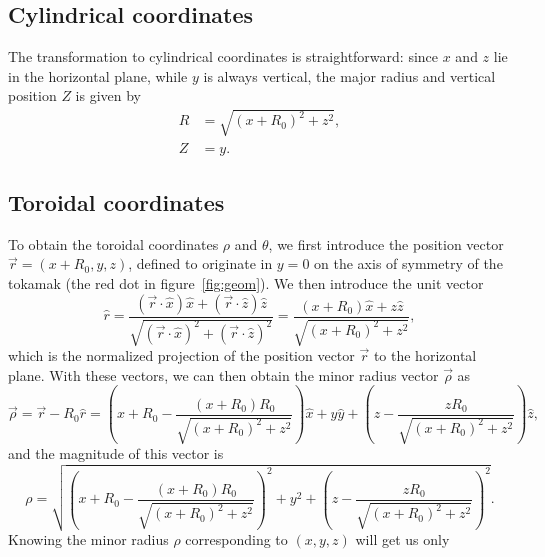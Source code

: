 \documentclass{notes}
\begin{document}
    \subsection{Cylindrical coordinates}
    The transformation to cylindrical coordinates is straightforward: since
    $x$ and $z$ lie in the horizontal plane, while $y$ is always vertical, the
    major radius and vertical position $Z$ is given by
    \begin{subequations}
        \begin{align}
        R &= \sqrt{(x+R_0)^2 + z^2},\\
        Z &= y.
        \end{align}
    \end{subequations}

    \subsection{Toroidal coordinates}
    To obtain the toroidal coordinates $\rho$ and $\theta$, we first introduce
    the position vector $\vec{r} = (x+R_0,y,z)$, defined to originate in $y=0$
    on the axis of symmetry of the tokamak (the red dot in
    figure~\ref{fig:geom}). We then introduce the unit vector
    \begin{equation}
        \hat{r} = \frac{\left(\vec{r}\cdot\hat{x}\right)\hat{x} + \left(\vec{r}\cdot\hat{z}\right)\hat{z}}
        {\sqrt{\left(\vec{r}\cdot\hat{x}\right)^2 + \left(\vec{r}\cdot\hat{z}\right)^2}} =
        \frac{(x+R_0)\hat{x} + z\hat{z}}{\sqrt{(x+R_0)^2+z^2}},
    \end{equation}
    which is the normalized projection of the position vector $\vec{r}$ to the
    horizontal plane. With these vectors, we can then obtain the minor radius
    vector $\vec{\rho}$ as
    \begin{equation}
        \vec{\rho} = \vec{r}-R_0\hat{r} =
        \left(x+R_0-\frac{(x+R_0)R_0}{\sqrt{\left(x+R_0\right)^2 + z^2}}\right)\hat{x}
        + y\hat{y}
        + \left(z-\frac{zR_0}{\sqrt{\left(x+R_0\right)^2 + z^2}}\right)\hat{z},
    \end{equation}
    and the magnitude of this vector is
    \begin{equation}
        \rho = \sqrt{
            \left(x+R_0-\frac{(x+R_0)R_0}{\sqrt{\left(x+R_0\right)^2 + z^2}}\right)^2
            + y^2
            + \left(z-\frac{zR_0}{\sqrt{\left(x+R_0\right)^2 + z^2}}\right)^2
        }.
    \end{equation}
    Knowing the minor radius $\rho$ corresponding to $(x,y,z)$ will get us only
\end{document}
